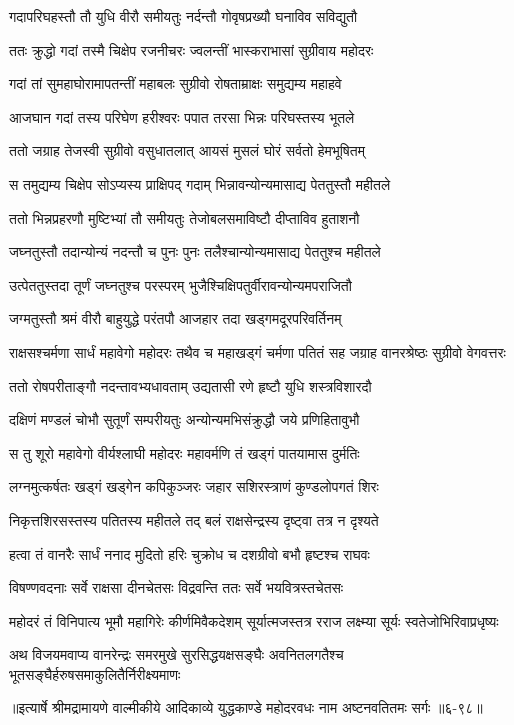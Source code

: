\twolineshloka
{गदापरिघहस्तौ तौ युधि वीरौ समीयतुः}
{नर्दन्तौ गोवृषप्रख्यौ घनाविव सविद्युतौ} %

\twolineshloka
{ततः क्रुद्धो गदां तस्मै चिक्षेप रजनीचरः}
{ज्वलन्तीं भास्कराभासां सुग्रीवाय महोदरः} %

\twolineshloka
{गदां तां सुमहाघोरामापतन्तीं महाबलः}
{सुग्रीवो रोषताम्राक्षः समुद्यम्य महाहवे} %

\twolineshloka
{आजघान गदां तस्य परिघेण हरीश्वरः}
{पपात तरसा भिन्नः परिघस्तस्य भूतले} %

\twolineshloka
{ततो जग्राह तेजस्वी सुग्रीवो वसुधातलात्}
{आयसं मुसलं घोरं सर्वतो हेमभूषितम्} %

\twolineshloka
{स तमुद्यम्य चिक्षेप सोऽप्यस्य प्राक्षिपद् गदाम्}
{भिन्नावन्योन्यमासाद्य पेततुस्तौ महीतले} %

\twolineshloka
{ततो भिन्नप्रहरणौ मुष्टिभ्यां तौ समीयतुः}
{तेजोबलसमाविष्टौ दीप्ताविव हुताशनौ} %

\twolineshloka
{जघ्नतुस्तौ तदान्योन्यं नदन्तौ च पुनः पुनः}
{तलैश्चान्योन्यमासाद्य पेततुश्च महीतले} %

\twolineshloka
{उत्पेततुस्तदा तूर्णं जघ्नतुश्च परस्परम्}
{भुजैश्चिक्षिपतुर्वीरावन्योन्यमपराजितौ} %

\twolineshloka
{जग्मतुस्तौ श्रमं वीरौ बाहुयुद्धे परंतपौ}
{आजहार तदा खड्गमदूरपरिवर्तिनम्} %

\threelineshloka
{राक्षसश्चर्मणा सार्धं महावेगो महोदरः}
{तथैव च महाखड्गं चर्मणा पतितं सह}
{जग्राह वानरश्रेष्ठः सुग्रीवो वेगवत्तरः} %

\twolineshloka
{ततो रोषपरीताङ्गौ नदन्तावभ्यधावताम्}
{उद्यतासी रणे हृष्टौ युधि शस्त्रविशारदौ} %

\twolineshloka
{दक्षिणं मण्डलं चोभौ सुतूर्णं सम्परीयतुः}
{अन्योन्यमभिसंक्रुद्धौ जये प्रणिहितावुभौ} %

\twolineshloka
{स तु शूरो महावेगो वीर्यश्लाघी महोदरः}
{महावर्मणि तं खड्गं पातयामास दुर्मतिः} %

\twolineshloka
{लग्नमुत्कर्षतः खड्गं खड्गेन कपिकुञ्जरः}
{जहार सशिरस्त्राणं कुण्डलोपगतं शिरः} %

\twolineshloka
{निकृत्तशिरसस्तस्य पतितस्य महीतले}
{तद् बलं राक्षसेन्द्रस्य दृष्ट्वा तत्र न दृश्यते} %

\twolineshloka
{हत्वा तं वानरैः सार्धं ननाद मुदितो हरिः}
{चुक्रोध च दशग्रीवो बभौ हृष्टश्च राघवः} %

\twolineshloka
{विषण्णवदनाः सर्वे राक्षसा दीनचेतसः}
{विद्रवन्ति ततः सर्वे भयवित्रस्तचेतसः} %

\twolineshloka
{महोदरं तं विनिपात्य भूमौ महागिरेः कीर्णमिवैकदेशम्}
{सूर्यात्मजस्तत्र रराज लक्ष्म्या सूर्यः स्वतेजोभिरिवाप्रधृष्यः} %

\twolineshloka
{अथ विजयमवाप्य वानरेन्द्रः समरमुखे सुरसिद्धयक्षसङ्घैः}
{अवनितलगतैश्च भूतसङ्घैर्हरुषसमाकुलितैर्निरीक्ष्यमाणः} %


॥इत्यार्षे श्रीमद्रामायणे वाल्मीकीये आदिकाव्ये युद्धकाण्डे महोदरवधः नाम अष्टनवतितमः सर्गः ॥६-९८॥
